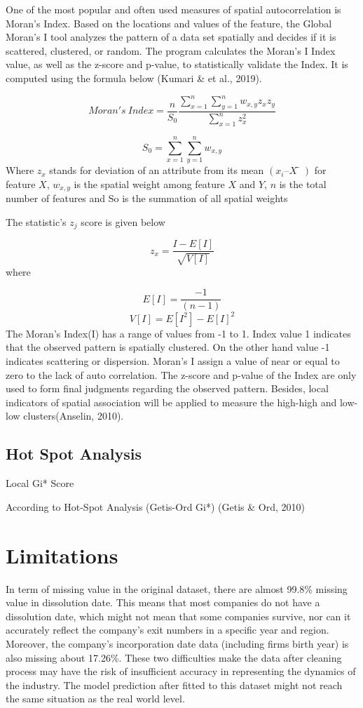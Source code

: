 \documentclass[
  12pt,
  oneside]{book}
\begin{document}
One of the most popular and often used measures of spatial autocorrelation is Moran's Index. Based on the locations and values of the feature, the Global Moran's I tool analyzes the pattern of a data set spatially and decides if it is scattered, clustered, or random. The program calculates the Moran's I Index value, as well as the z-score and p-value, to statistically validate the Index. It is computed using the formula below (Kumari \& et al., 2019).

\[ Moran's \ Index = \frac{n}{S_0} \frac{\sum_{x=1}^n \sum_{y=1}^n w_{x,y} z_x z_y}{\sum_{x=1}^n z_x^2}\]

\[ S_0 = \sum_{x=1}^n \sum_{y=1}^n w_{x,y}\]
Where \(z_x\) stands for deviation of an attribute from its mean \((x_i – X̅)\) for feature \(X\), \(w_{x,y}\) is the spatial weight among feature \(X\) and \(Y\), \(n\) is the total number of features and So is the summation of all spatial weights

The statistic's \(z_j\) score is given below

\[ z_x = \frac{I - E[I]}{\sqrt{V[I]}}\]
where

\[ E[I] = \frac{-1}{(n-1)}\]
\[ V[I] = E[I^2]-E[I]^2\]
The Moran's Index(I) has a range of values from -1 to 1. Index value 1 indicates that the observed pattern is spatially clustered. On the other hand value -1 indicates scattering or dispersion. Moran's I assign a value of near or equal to zero to the lack of auto correlation. The z-score and p-value of the Index are only used to form final judgments regarding the observed pattern. Besides, local indicators of spatial association will be applied to measure the high-high and low-low clusters(Anselin, 2010).

\hypertarget{hot-spot-analysis}{%
\subsection{Hot Spot Analysis}\label{hot-spot-analysis}}

Local Gi* Score

According to Hot-Spot Analysis (Getis-Ord Gi*) (Getis \& Ord, 2010)

\hypertarget{limitations}{%
\section{Limitations}\label{limitations}}

In term of missing value in the original dataset, there are almost 99.8\% missing value in dissolution date. This means that most companies do not have a dissolution date, which might not mean that some companies survive, nor can it accurately reflect the company's exit numbers in a specific year and region. Moreover, the company's incorporation date data (including firms birth year) is also missing about 17.26\%. These two difficulties make the data after cleaning process may have the risk of insufficient accuracy in representing the dynamics of the industry. The model prediction after fitted to this dataset might not reach the same situation as the real world level.
\end{document}
